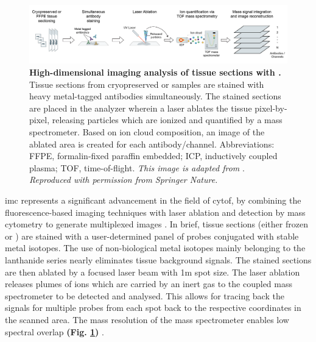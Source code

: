 \begin{figure}[H]
    \centering
    \includegraphics[width=\linewidth]{Chapter1/Fig/F1-12-01.png}
    \caption[Overview of Imaging Mass Cytometry workflow]{\textbf{High-dimensional imaging analysis of tissue sections with .} Tissue sections from cryopreserved or  samples are stained with heavy metal-tagged antibodies simultaneously. The stained sections are placed in the  analyzer wherein a laser ablates the tissue pixel-by-pixel, releasing particles which are ionized and quantified by a mass spectrometer. Based on ion cloud composition, an image of the ablated area is created for each antibody/channel. Abbreviations: FFPE, formalin-fixed paraffin embedded; ICP, inductively coupled plasma; TOF, time-of-flight. \textit{This image is adapted from }\textbf{\cite{damond_map_2019,hartmann_immune_2020}}. \textit{Reproduced with permission from Springer Nature.}}
    \label{fig:chp1_imc_workflow}
\end{figure}

\par \gls{imc} represents a significant advancement in the field of \gls{cytof}, by combining the fluorescence-based imaging techniques with laser ablation and detection by mass cytometry to generate multiplexed images \textbf{\cite{veenstra_research_2021,chang_imaging_2017}}. In brief, tissue sections (either frozen or ) are stained with a user-determined panel of probes conjugated with stable metal isotopes. The use of non-biological metal isotopes mainly belonging to the lanthanide series nearly eliminates tissue background signals. The stained sections are then ablated by a focused laser beam with 1\textmu m spot size. The laser ablation releases plumes of ions which are carried by an inert gas to the coupled mass spectrometer to be detected and analysed. This allows for tracing back the signals for multiple probes from each spot back to the respective coordinates in the scanned area. The mass resolution of the mass spectrometer enables low spectral overlap \textbf{(Fig. \ref{fig:chp1_imc_workflow})}
\textbf{\cite{veenstra_research_2021,chang_imaging_2017}}.\\


